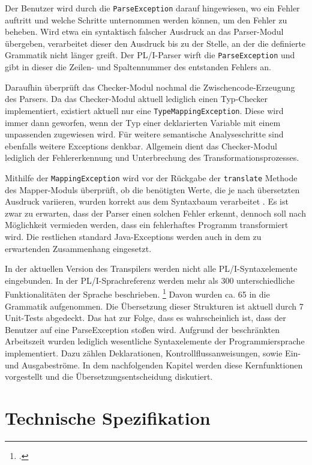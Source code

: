 Der Benutzer wird durch die \verb+ParseException+ darauf hingewiesen, wo ein Fehler auftritt und welche Schritte unternommen werden können, um den Fehler zu beheben.
Wird etwa ein syntaktisch falscher Ausdruck an das Parser-Modul übergeben, verarbeitet dieser den Ausdruck
bis zu der Stelle, an der die definierte Grammatik nicht länger greift.
Der PL/I-Parser wirft die \verb+ParseException+ und gibt in dieser die Zeilen- und Spaltennummer des
entstanden Fehlers an.

Daraufhin überprüft das Checker-Modul nochmal die Zwischencode-Erzeugung des Parsers.
Da das Checker-Modul aktuell lediglich einen Typ-Checker implementiert, existiert aktuell nur eine \verb+TypeMappingException+.
Diese wird immer dann geworfen, wenn der Typ einer deklarierten Variable mit einem unpassenden zugewiesen wird.
Für weitere semantische Analyseschritte sind ebenfalls weitere Exceptions denkbar. Allgemein dient das Checker-Modul lediglich der Fehlererkennung und Unterbrechung des Transformationsprozesses.

Mithilfe der \verb+MappingException+ wird vor der Rückgabe der \verb+translate+ Methode des Mapper-Moduls überprüft, ob 
die benötigten Werte, die je nach übersetzten Ausdruck variieren, wurden korrekt aus dem Syntaxbaum verarbeitet .
Es ist zwar zu erwarten, dass der Parser einen solchen Fehler erkennt, dennoch soll nach Möglichkeit vermieden werden, dass ein fehlerhaftes Programm transformiert wird. Die restlichen standard Java-Exceptions werden auch in dem zu erwartenden Zusammenhang eingesetzt.

In der aktuellen Version des Transpilers werden nicht alle PL/I-Syntaxelemente eingebunden.
In der PL/I-Sprachreferenz werden mehr als 300 unterschiedliche Funktionalitäten der Sprache beschrieben. \footcite[Vgl. ][S. 5ff.]{pliref}
Davon wurden ca. 65 in die Grammatik aufgenommen. Die Übersetzung dieser Strukturen ist aktuell durch 7 Unit-Tests abgedeckt.
Das hat zur Folge, dass es wahrscheinlich ist, dass der Benutzer auf eine ParseException stoßen wird.
Aufgrund der beschränkten Arbeitszeit wurden lediglich wesentliche Syntaxelemente der Programmiersprache implementiert.
Dazu zählen Deklarationen, Kontrollflussanweisungen, sowie Ein- und Ausgabeströme.
In dem nachfolgenden Kapitel werden diese Kernfunktionen vorgestellt und die Übersetzungsentscheidung
diskutiert. 

\pagebreak
\section{Technische Spezifikation}
